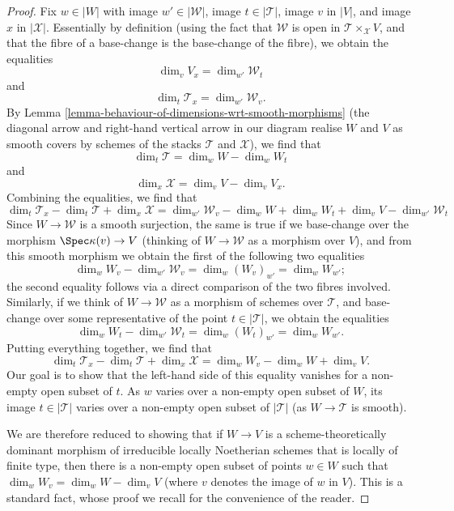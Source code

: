 \begin{proof}
\medskip\noindent
Fix $w \in |W|$ with image $w' \in |\mathcal{W}|$,
image $t \in |\mathcal{T}|$, image $v$ in $|V|$,
and image $x$ in $|\mathcal{X}|$.
Essentially by definition (using the
fact that $\mathcal{W}$ is open in $\mathcal{T}\times_{\mathcal{X}} V$, and that
the fibre of a base-change is the base-change of the fibre),
we obtain the equalities
$$
\dim_v V_x = \dim_{w'} \mathcal{W}_t
$$
and
$$
\dim_t \mathcal{T}_x = \dim_{w'} \mathcal{W}_v.
$$
By Lemma \ref{lemma-behaviour-of-dimensions-wrt-smooth-morphisms}
(the diagonal arrow and right-hand vertical
arrow in our diagram realise $W$ and $V$ as smooth covers by
schemes of the stacks $\mathcal{T}$ and $\mathcal{X}$), we find that
$$
\dim_t \mathcal{T} = \dim_w W - \dim_w W_t
$$
and
$$
\dim_x \mathcal{X} = \dim_v V - \dim_v V_x.
$$
Combining the equalities, we find that
$$
\dim_t \mathcal{T}_x - \dim_t \mathcal{T} + \dim_x \mathcal{X}
= \dim_{w'} \mathcal{W}_v - \dim_w W + \dim_w W_t + \dim_v V -
\dim_{w'} \mathcal{W}_t
$$
Since $W \to \mathcal{W}$ is a smooth surjection, the same is true
if we base-change over the morphism $\Spec \kappa(v) \to V$
(thinking of $W \to \mathcal{W}$ as a morphism over $V$),
and from this smooth morphism we obtain the first of the following
two equalities
$$
\dim_w W_v - \dim_{w'} \mathcal{W}_v = \dim_w (W_v)_{w'} = \dim_w W_{w'};
$$
the second equality follows via a direct comparison of the
two fibres involved.
Similarly, if we think of $W \to \mathcal{W}$ as a morphism of schemes
over $\mathcal{T}$, and base-change over some representative of the point
$t \in |\mathcal{T}|$, we obtain the equalities
$$
\dim_w W_t - \dim_{w'} \mathcal{W}_t = \dim_w (W_t)_{w'} = \dim_w W_{w'}.
$$
Putting everything together, we find that
$$
\dim_t \mathcal{T}_x - \dim_t \mathcal{T} + \dim_x \mathcal{X}
=  \dim_w W_v - \dim_w W + \dim_v V.
$$
Our goal is to show that the left-hand side of this equality
vanishes for a non-empty open subset
of $t$.  As $w$ varies over a non-empty open subset of $W$,
its image $t \in |\mathcal{T}|$ varies over a non-empty open
subset of $|\mathcal{T}|$ (as $W \to \mathcal{T}$ is smooth).

\medskip\noindent
We are therefore reduced to showing that if $W\to V$ is a
scheme-theoretically dominant morphism of irreducible locally
Noetherian schemes that is locally of finite type,
then there is a non-empty open subset of
points $w\in W$ such that $\dim_w W_v =\dim_w W - \dim_v V$
(where $v$ denotes the image of $w$ in $V$).
This is a standard fact,
whose proof we recall for the convenience of the reader.


\end{proof}
